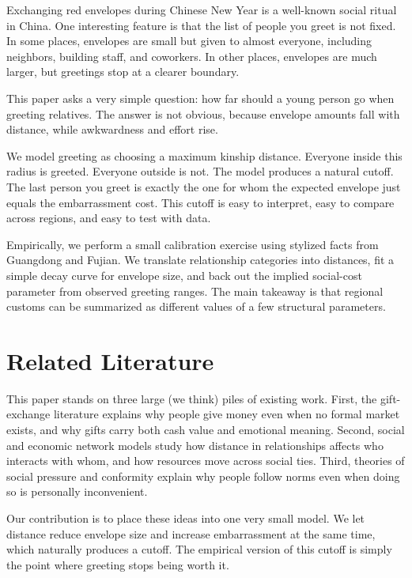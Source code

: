 \documentclass[AER]{AEA}
\begin{document}

Exchanging red envelopes during Chinese New Year is a well-known social ritual in China. One interesting feature is that the list of people you greet is not fixed. In some places, envelopes are small but given to almost everyone, including neighbors, building staff, and coworkers. In other places, envelopes are much larger, but greetings stop at a clearer boundary. 

This paper asks a very simple question: how far should a young person go when greeting relatives. The answer is not obvious, because envelope amounts fall with distance, while awkwardness and effort rise. 

We model greeting as choosing a maximum kinship distance. Everyone inside this radius is greeted. Everyone outside is not. The model produces a natural cutoff. The last person you greet is exactly the one for whom the expected envelope just equals the embarrassment cost. This cutoff is easy to interpret, easy to compare across regions, and easy to test with data. 

Empirically, we perform a small calibration exercise using stylized facts from Guangdong and Fujian. We translate relationship categories into distances, fit a simple decay curve for envelope size, and back out the implied social-cost parameter from observed greeting ranges. The main takeaway is that regional customs can be summarized as different values of a few structural parameters.

\section{Related Literature}

This paper stands on three large (we think) piles of existing work. First, the gift-exchange literature explains why people give money even when no formal market exists, and why gifts carry both cash value and emotional meaning. Second, social and economic network models study how distance in relationships affects who interacts with whom, and how resources move across social ties. Third, theories of social pressure and conformity explain why people follow norms even when doing so is personally inconvenient. 

Our contribution is to place these ideas into one very small model. We let distance reduce envelope size and increase embarrassment at the same time, which naturally produces a cutoff. The empirical version of this cutoff is simply the point where greeting stops being worth it.
\end{document}
